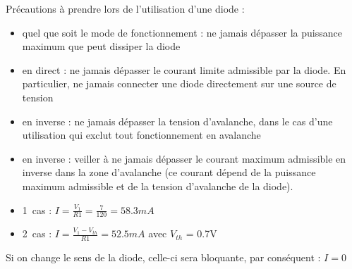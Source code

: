 \documentclass{../template/tp}
\begin{document}
{Précautions à prendre lors de l'utilisation d'une diode :
\begin{itemize}
\item quel que soit le mode de fonctionnement : ne jamais dépasser la puissance maximum que peut dissiper la diode
\item en direct : ne jamais dépasser le courant limite admissible par la diode. En particulier, ne jamais connecter une diode directement sur une source de tension
\item en inverse : ne jamais dépasser la tension d'avalanche, dans le cas d'une utilisation qui exclut tout fonctionnement en avalanche
\item en inverse : veiller à ne jamais dépasser le courant maximum admissible en inverse dans la zone d'avalanche (ce courant dépend de la puissance maximum admissible et de la tension d'avalanche de la diode).
\end{itemize}
}

{%
\begin{itemize}
    \item 1\ier~cas : $I = \frac{V_1}{R1} = \frac{7}{120} = 58.3mA$
    \item 2\ieme~cas : $I = \frac{V_1-V_{th}}{R1} = 52.5mA$ avec $V_{th}$ = 0.7V
\end{itemize}
Si on change le sens de la diode, celle-ci sera bloquante, par conséquent : $I=0$

}
\end{document}
